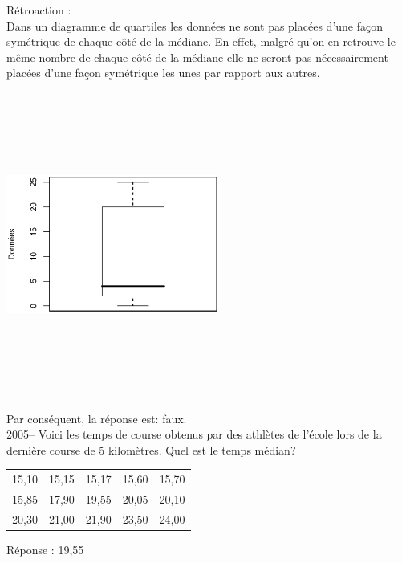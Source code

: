 \documentclass[letterpaper, 12pt]{article}
\begin{document}
R\'etroaction :\\
Dans un diagramme de quartiles les donn\'ees ne sont pas plac\'ees d'une fa\c con sym\'etrique de chaque c\^ot\'e de la m\'ediane. En effet, malgr\'e qu'on en retrouve le m\^eme nombre de chaque c\^ot\'e de la m\'ediane elle ne seront pas n\'ecessairement plac\'ees d'une fa\c con sym\'etrique les unes par rapport aux autres.
\begin{center}
 \includegraphics[width=7cm,height=10cm,angle=-90]{G2004.eps}
\end{center}
Par cons\'equent, la r\'eponse est: faux.\\

2005-- Voici les temps de course obtenus par des athl\`etes de l'\'ecole lors de la derni\`ere course de 5 kilom\`etres. Quel est le temps m\'edian? \\
\begin{center}

\begin{tabular}{|c  c  c  c  c|} \hline

15,10 & 15,15 & 15,17 & 15,60 & 15,70 \\
15,85 & 17,90 & 19,55 & 20,05 & 20,10 \\
20,30 & 21,00 & 21,90 & 23,50 & 24,00 \\ \hline

\end{tabular}
\end{center}

R\'eponse : 19,55\\
\end{document}
